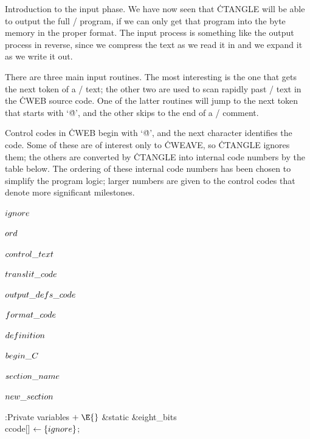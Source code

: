 Introduction to the input phase.
We have now seen that \.{CTANGLE} will be able to output the full
\CEE/ program, if we can only get that program into the byte memory in
the proper format. The input process is something like the output process
in reverse, since we compress the text as we read it in and we expand it
as we write it out.

There are three main input routines. The most interesting is the one that gets
the next token of a \CEE/ text; the other two are used to scan rapidly past
\TEX/ text in the \.{CWEB} source code. One of the latter routines will jump to
the next token that starts with `\.{@}', and the other skips to the end
of a \CEE/ comment.

\fi

Control codes in \.{CWEB} begin with `\.{@}', and the next character
identifies the code. Some of these are of interest only to \.{CWEAVE},
so \.{CTANGLE} ignores them; the others are converted by \.{CTANGLE} into
internal code numbers by the  table below. The ordering
of these internal code numbers has been chosen to simplify the program logic;
larger numbers are given to the control codes that denote more significant
milestones.

\Y\B\4\D$\\{ignore}$ \5
\par
\B\4\D$\\{ord}$ \5
\par
\B\4\D$\\{control\_text}$ \5
\par
\B\4\D$\\{translit\_code}$ \5
\par
\B\4\D$\\{output\_defs\_code}$ \5
\par
\B\4\D$\\{format\_code}$ \5
\par
\B\4\D$\\{definition}$ \5
\par
\B\4\D$\\{begin\_C}$ \5
\par
\B\4\D$\\{section\_name}$ \5
\par
\B\4\D$\\{new\_section}$ \5
\par
\Y\B\4:Private variables\X${}\mathrel+\E{}$\6
\&{static} \&{eight\_bits} \\{ccode}[]${}\leftarrow\{\\{ignore}\}{}$;\par
\fi

